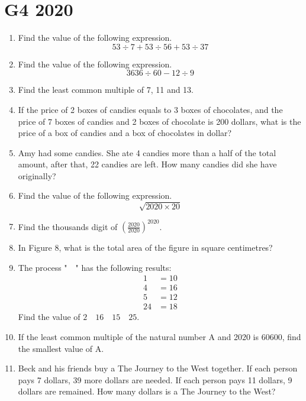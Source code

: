 \documentclass[11pt]{scrartcl}
\begin{document}
\section{G4 2020}
\begin{enumerate}
    \item Find the value of the following expression.
    \[53 \div 7 + 53 \div 56 + 53 \div 37\]
    
    \item Find the value of the following expression.
    \[3636 \div 60 - 12 \div 9\]
    
    \item Find the least common multiple of 7, 11 and 13.
    
    \item If the price of 2 boxes of candies equals to 3 boxes of chocolates, and the price of 7 boxes of candies and 2 boxes of chocolate is 200 dollars, what is the price of a box of candies and a box of chocolates in dollar?
    
    \item Amy had some candies. She ate 4 candies more than a half of the total amount, after that, 22 candies are left. How many candies did she have originally?
    
    \item Find the value of the following expression.
    \[\sqrt{2020 \times 20}\]
    
    \item Find the thousands digit of $\left(\frac{2020}{2020}\right)^{2020}$.
    
    \item In Figure 8, what is the total area of the figure in square centimetres?
    
    \item The process "$\boxed{\quad}$" has the following results:
    \begin{align*}
        \boxed{1} &= 10 \\
        \boxed{4} &= 16 \\
        \boxed{5} &= 12 \\
        \boxed{24} &= 18
    \end{align*}
    Find the value of $\boxed{2 \quad 16 \quad 15 \quad 25}$.
    
    \item If the least common multiple of the natural number A and 2020 is 60600, find the smallest value of A.
    
    \item Beck and his friends buy a The Journey to the West together. If each person pays 7 dollars, 39 more dollars are needed. If each person pays 11 dollars, 9 dollars are remained. How many dollars is a The Journey to the West?
    

\end{enumerate}
\end{document}
